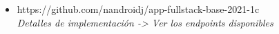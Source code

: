 \begin{itemize}

  
  \item https://github.com/nandroidj/app-fullstack-base-2021-1c
    \\ \textit{Detalles de implementación -> Ver los endpoints disponibles}



\end{itemize}


